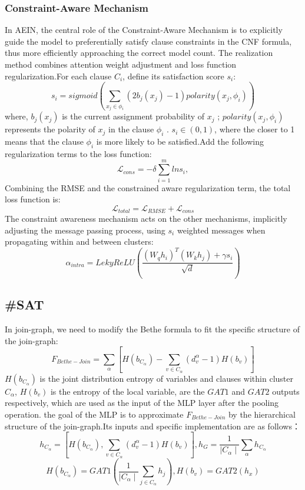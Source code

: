 \subsubsection{Constraint-Aware Mechanism}
In AEIN, the central role of the Constraint-Aware Mechanism is to explicitly guide the model to preferentially satisfy clause constraints in the CNF formula, thus more efficiently approaching the correct model count. The realization method combines attention weight adjustment and loss function regularization.For each clause \(C_i\), define its satisfaction score \(s_i\):
\begin{equation}
s_i=sigmoid(\sum_{x_j\in \phi_i}(2b_j(x_j)-1)polarity(x_j,\phi_i))
\end{equation}
where, \(b_j(x_j)\) is  the current assignment probability of \(x_j\) ;  \(polarity(x_j,\phi_i)\) represents the polarity of \(x_j\) in the clause \(\phi_i\) .
\(s_i\in (0,1)\), where the closer to 1 means that the clause \(\phi_i\) is more likely to be satisfied.Add the following regularization terms to the loss function:
\begin{equation}
\mathcal L_{cons}=-\delta  \sum_{i=1}^mlns_i,
\end{equation}
Combining the RMSE and the constrained aware regularization term, the total loss function is:
\begin{equation}
\mathcal L_{total}=\mathcal L_{RMSE}+\mathcal L_{cons}
\end{equation}
The constraint awareness mechanism acts on the other mechanisms, implicitly adjusting the message passing process, using \(s_i\) weighted messages when propagating within and between clusters:
\begin{equation}
\alpha_{intra}=LekyReLU(\frac{(W_qh_i)^T(W_kh_j)+\gamma s_i}{\sqrt{d}})
\end{equation}
\subsection{\#SAT}
In join-graph, we need to modify the Bethe formula to fit the specific structure of the join-graph:
\begin{equation}
   F_{Bethe-Join}=\sum_\alpha [H(b_{C_\alpha})-\sum_{v\in C_\alpha}(d_v^\alpha-1)H(b_v)]
\end{equation}
\(H(b_{C_\alpha})\) is the joint distribution entropy of variables and clauses within cluster \(C_\alpha\), \(H(b_v)\) is the entropy of the local variable, are the \(GAT1\) and \(GAT2\) outputs respectively, which are used as the input of the MLP layer after the pooling operation. the goal of the MLP is to approximate \(F_{Bethe-Join}\) by  the hierarchical structure of the join-graph.Its inputs and specific implementation are as follows：
\begin{equation}
    h_{C_\alpha}=[H(b_{C_\alpha}), \sum_{v\in C_\alpha}(d_v^\alpha-1)H(b_v)], h_G=\frac{1}{\mid{C_\alpha}\mid}\sum_\alpha h_{C_\alpha}
\end{equation}
\begin{equation}
   H(b_{C_\alpha})=GAT1(\frac{1}{ \mid C_\alpha\mid}\sum_{j\in C_\alpha}h_j), H(b_v)=GAT2(h_x)
\end{equation}


